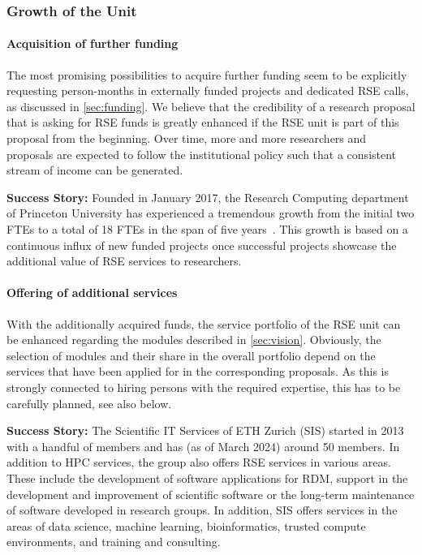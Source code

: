 \documentclass[a4paper]{article}
\begin{document}
\subsubsection{Growth of the Unit}

\paragraph{Acquisition of further funding}
The most promising possibilities to acquire further funding seem to be explicitly requesting person-months in externally funded projects and dedicated RSE calls, as discussed in \autoref{sec:funding}.
We believe that the credibility of a research proposal that is asking for RSE funds is greatly enhanced if the RSE unit is part of this proposal from the beginning.
Over time, more and more researchers and proposals are expected to follow the institutional policy such that a consistent stream of income can be generated.

\begin{mdframed}
\textbf{Success Story:} Founded in January 2017, the Research Computing department of Princeton University has experienced a tremendous growth from the initial two FTEs to a total of 18 FTEs in the span of five years~\autocite{Cosden2022a}.
This growth is based on a continuous influx of new funded projects once successful projects showcase the additional value of RSE services to researchers.
\end{mdframed}

\paragraph{Offering of additional services}
With the additionally acquired funds, the service portfolio of the RSE unit can be enhanced regarding the modules described in \autoref{sec:vision}.
Obviously, the selection of modules and their share in the overall portfolio depend on the services that have been applied for in the corresponding proposals.
As this is strongly connected to hiring persons with the required expertise, this has to be carefully planned, see also below.

\begin{mdframed}
\textbf{Success Story:} The Scientific IT Services of ETH Zurich (SIS) started in 2013 with a handful of members and has (as of March 2024) around 50 members.
In addition to HPC services, the group also offers RSE services in various areas.
These include the development of software applications for RDM, support in the development and improvement of scientific software or the long-term maintenance of software developed in research groups.
In addition, SIS offers services in the areas of data science, machine learning, bioinformatics, trusted compute environments, and training and consulting.
\end{mdframed}
\end{document}
